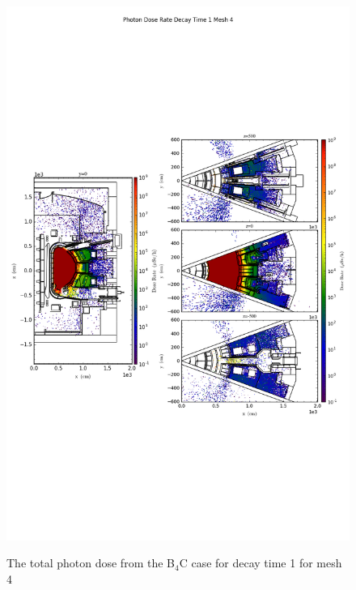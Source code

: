 \begin{figure}[ht!]
\centering
\includegraphics[trim={0cm 9cm 0cm 10cm},clip,scale=0.75]{../plots/final_model_nob4c/Photon_Dose_Rate_Decay_Time_1_Mesh_4.png}
\label{fig:photons_dc1_no4bc_m4_flux}
\caption{The total photon dose from the B$_4$C case for decay time 1 for mesh 4}
\end{figure}
